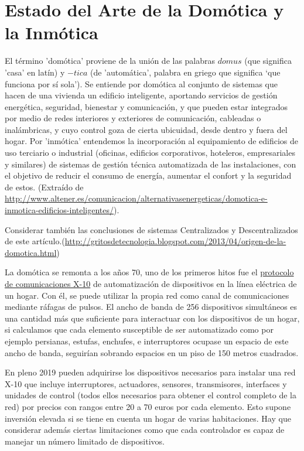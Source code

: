 \cleardoublepage

\chapter{Estado del Arte de la Domótica y la Inmótica}
\label{makereference2}

El término 'domótica' proviene de la unión de las palabras $domus$ (que significa 'casa' en latín) y $-tica$ (de 'automática', palabra en griego que significa ‘que funciona por sí sola’). Se entiende por domótica al conjunto de sistemas que hacen de una vivienda un edificio inteligente, aportando servicios de gestión energética, seguridad, bienestar y comunicación, y que pueden estar integrados por medio de redes interiores y exteriores de comunicación, cableadas o inalámbricas, y cuyo control goza de cierta ubicuidad, desde dentro y fuera del hogar.
Por 'inmótica' entendemos la incorporación al equipamiento de edificios de uso terciario o industrial (oficinas, edificios corporativos, hoteleros, empresariales y similares) de sistemas de gestión técnica automatizada de las instalaciones, con el objetivo de reducir el consumo de energía, aumentar el confort y la seguridad de estos.
(Extraído de \url{http://www.altener.es/comunicacion/alternativasenergeticas/domotica-e-inmotica-edificios-inteligentes/}).

Considerar también las conclusiones de sistemas Centralizados y Descentralizados de este artículo.(\url{http://gritosdetecnologia.blogspot.com/2013/04/origen-de-la-domotica.html})

La domótica se remonta a los años 70, uno de los primeros hitos fue el \href{https://es.wikipedia.org/wiki/X10}{protocolo de comunicaciones X-10} de automatización de dispositivos en la línea eléctrica de un hogar. Con él, se puede utilizar la propia red como canal de comunicaciones mediante ráfagas de pulsos. El ancho de banda de 256 dispositivos simultáneos es una cantidad más que suficiente para interactuar con los dispositivos de un hogar, si calculamos que cada elemento susceptible de ser automatizado como por ejemplo persianas, estufas, enchufes, e interruptores ocupase un espacio de este ancho de banda, seguirían sobrando espacios en un piso de 150 metros cuadrados.

En pleno 2019 pueden adquirirse los dispositivos necesarios para instalar una red X-10 que incluye interruptores, actuadores, sensores, transmisores, interfaces y unidades de control (todos ellos necesarios para obtener el control completo de la red) por precios con rangos entre 20 a 70 euros por cada elemento. Esto supone inversión elevada si se tiene en cuenta un hogar de varias habitaciones. Hay que considerar además ciertas limitaciones como que cada controlador es capaz de manejar un número limitado de dispositivos.

